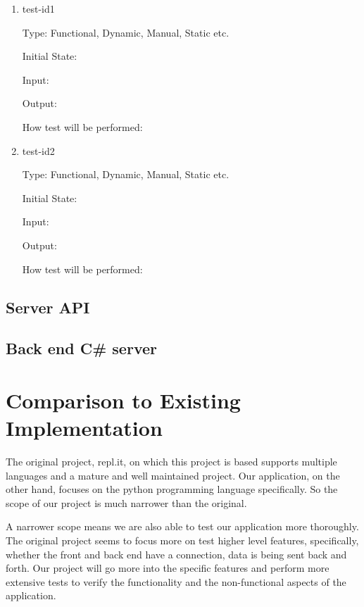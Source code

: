 \documentclass[12pt, titlepage]{article}
\begin{document}
\begin{enumerate}

\item{test-id1\\}

Type: Functional, Dynamic, Manual, Static etc.
					
Initial State: 
					
Input: 
					
Output: 
					
How test will be performed: 
					
\item{test-id2\\}

Type: Functional, Dynamic, Manual, Static etc.
					
Initial State: 
					
Input: 
					
Output: 
					
How test will be performed: 

\end{enumerate}

\subsection{Server API}

\subsection{Back end C\# server}

	
\section{Comparison to Existing Implementation}	
The original project, repl.it, on which this project is based supports multiple
languages and a mature and well maintained project. Our application, on the
other hand, focuses on the python programming language specifically. So the
scope of our project is much narrower than the original.

A narrower scope means we are also able to test our application more thoroughly.
The original project seems to focus more on test higher level features,
specifically, whether the front and back end have a connection, data is being
sent back and forth. Our project will go more into the specific features and
perform more extensive tests to verify the functionality and the non-functional
aspects of the application.
\end{document}
